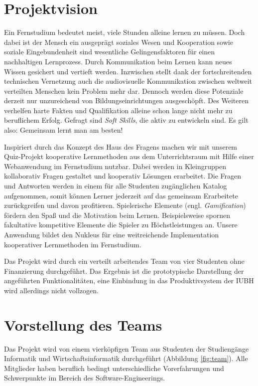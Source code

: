 \documentclass[a4paper,11pt,listof=numbered,glossary=totoc,parskip=half,toc=bib]{scrreprt}
\begin{document}
	
	\newpage
	\setcounter{tocdepth}{1}
	\tableofcontents
	\newpage


	\chapter{Projektvision}
	
	Ein Fernstudium bedeutet meist, viele Stunden alleine lernen zu müssen. Doch dabei ist der Mensch ein ausgeprägt soziales Wesen und Kooperation sowie soziale Eingebundenheit sind wesentliche Gelingensfaktoren für einen nachhaltigen Lernprozess. Durch Kommunikation beim Lernen kann neues Wissen gesichert und vertieft werden. Inzwischen stellt dank der fortschreitenden technischen Vernetzung auch die audiovisuelle Kommunikation zwischen weltweit verteilten Menschen kein Problem mehr dar. Dennoch werden diese Potenziale derzeit nur unzureichend von Bildungseinrichtungen ausgeschöpft.
Des Weiteren verhelfen harte Fakten und Qualifikation alleine schon lange nicht mehr zu beruflichem Erfolg. Gefragt sind \textit{Soft Skills}, die aktiv zu entwickeln sind. Es gilt also: Gemeinsam lernt man am besten!

Inspiriert durch das Konzept des \frqq{}Haus des Fragens\flqq{} \autocite{HausDesFragens} machen wir mit unserem Quiz-Projekt kooperative Lernmethoden aus dem Unterrichtsraum mit Hilfe einer Webanwendung im Fernstudium nutzbar. Dabei werden in Kleingruppen kollaborativ Fragen gestaltet und kooperativ Lösungen erarbeitet. Die Fragen und Antworten werden in einem für alle Studenten zugänglichen Katalog aufgenommen, somit können Lerner jederzeit auf das gemeinsam Erarbeitete zurückgreifen und davon profitieren. Spielerische Elemente (engl. \textit{Gamification}) fördern den Spaß und die Motivation beim Lernen. Beispielsweise spornen fakultative kompetitive Elemente die Spieler zu Höchstleistungen an. Unsere Anwendung bildet den Nukleus für eine weitreichende Implementation kooperativer Lernmethoden im Fernstudium.

Das Projekt wird durch ein verteilt arbeitendes Team von vier Studenten ohne Finanzierung durchgeführt. Das Ergebnis ist die prototypische Darstellung der angeführten Funktionalitäten, eine Einbindung in das Produktivsystem der IUBH wird allerdings nicht vollzogen.
\newpage
	\chapter{Vorstellung des Teams}
	Das Projekt wird von einem vierköpfigen Team aus Studenten der Studiengänge Informatik und Wirtschaftsinformatik durchgeführt (Abbildung \ref{fig:team}). Alle Mitglieder haben beruflich bedingt unterschiedliche Vorerfahrungen und Schwerpunkte im Bereich des Software-Engineerings.
\end{document}
